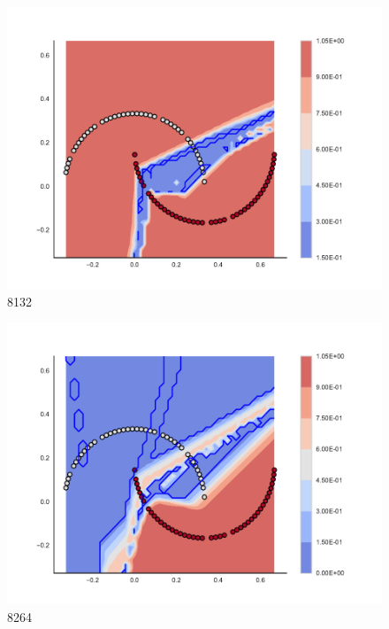 \begin{subfigure}[b]{0.12\textwidth}
    \includegraphics[clip, trim=2.35cm 1.75cm 4.5cm 0cm,width=\textwidth]{img/convergence/8132.pdf}
    \caption{8132}
    \label{fig:convergence_8132}
\end{subfigure}
%
\begin{subfigure}[b]{0.12\textwidth}
    \includegraphics[clip, trim=2.35cm 1.75cm 4.5cm 0cm,width=\textwidth]{img/convergence/8264.pdf}
    \caption{8264}
    \label{fig:convergence_8264}
\end{subfigure}
%
